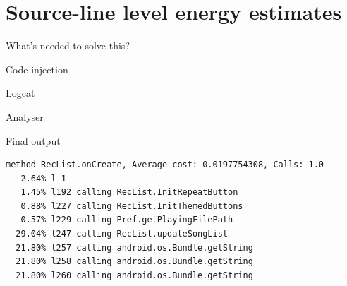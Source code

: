 \section{Source-line level energy estimates}
%
%
\begin{frame}{What's needed to solve this?}
 
\end{frame}  
%
%
 \begin{frame}{Code injection}
 
\end{frame}  
%
%
\begin{frame}{Logcat}
 
\end{frame}  
%
%
\begin{frame}{Analyser} %
 
\end{frame}  
 
\begin{frame}[fragile]{Final output}
\centering
{\tiny%
\begin{lstlisting}
method RecList.onCreate, Average cost: 0.0197754308, Calls: 1.0
   2.64% l-1
   1.45% l192 calling RecList.InitRepeatButton
   0.88% l227 calling RecList.InitThemedButtons
   0.57% l229 calling Pref.getPlayingFilePath
  29.04% l247 calling RecList.updateSongList
  21.80% l257 calling android.os.Bundle.getString
  21.80% l258 calling android.os.Bundle.getString
  21.80% l260 calling android.os.Bundle.getString
\end{lstlisting}}
\end{frame}
%
%
